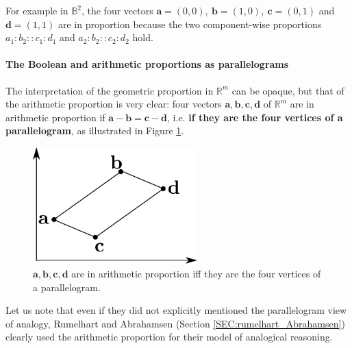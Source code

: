 \begin{testexample}
For example in $\mathbb{B}^2$, the four vectors $\mathbf{a}
= (0, 0),~ \mathbf{b} = (1, 0),~ \mathbf{c} = (0, 1)$ and $\mathbf{d} = (1, 1)$
are in proportion because the two component-wise proportions $a_1 : b_2 :: c_1
: d_1$ and $a_2 : b_2 :: c_2:d_2$ hold.
\end{testexample}

\paragraph{The Boolean and arithmetic proportions as parallelograms\\}

The interpretation of the geometric proportion in $\mathbb{R}^m$ can be opaque,
but that of the arithmetic proportion is very clear: four vectors $\mathbf{a},
\mathbf{b}, \mathbf{c}, \mathbf{d}$ of $\mathbb{R}^m$ are in arithmetic
proportion if $\mathbf{a} - \mathbf{b} = \mathbf{c} - \mathbf{d}$, i.e.
\textbf{if they are the four vertices of a parallelogram}, as illustrated in
Figure
\ref{FIG:arithmetic_proportion}.

\begin{figure}[!h]
\centering
  \includegraphics[width=2.5in]{figures/arithmetic_proportion.pdf}
  \caption{$\mathbf{a}, \mathbf{b}, \mathbf{c}, \mathbf{d}$
  are in arithmetic proportion iff they are the four vertices of a
  parallelogram.}
\label{FIG:arithmetic_proportion}
\end{figure}

Let us note that even if they did not explicitly mentioned the parallelogram
view of analogy, Rumelhart and Abrahamsen (Section
\ref{SEC:rumelhart_Abrahamsen}) clearly used the arithmetic proportion for
their model of analogical reasoning.

